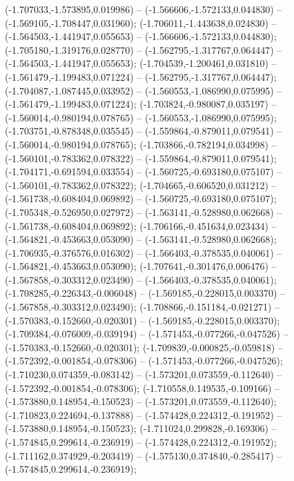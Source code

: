  (-1.707033,-1.573895,0.019986) -- (-1.566606,-1.572133,0.044830) -- (-1.569105,-1.708447,0.031960);
 (-1.706011,-1.443638,0.024830) -- (-1.564503,-1.441947,0.055653) -- (-1.566606,-1.572133,0.044830);
 (-1.705180,-1.319176,0.028770) -- (-1.562795,-1.317767,0.064447) -- (-1.564503,-1.441947,0.055653);
 (-1.704539,-1.200461,0.031810) -- (-1.561479,-1.199483,0.071224) -- (-1.562795,-1.317767,0.064447);
 (-1.704087,-1.087445,0.033952) -- (-1.560553,-1.086990,0.075995) -- (-1.561479,-1.199483,0.071224);
 (-1.703824,-0.980087,0.035197) -- (-1.560014,-0.980194,0.078765) -- (-1.560553,-1.086990,0.075995);
 (-1.703751,-0.878348,0.035545) -- (-1.559864,-0.879011,0.079541) -- (-1.560014,-0.980194,0.078765);
 (-1.703866,-0.782194,0.034998) -- (-1.560101,-0.783362,0.078322) -- (-1.559864,-0.879011,0.079541);
 (-1.704171,-0.691594,0.033554) -- (-1.560725,-0.693180,0.075107) -- (-1.560101,-0.783362,0.078322);
 (-1.704665,-0.606520,0.031212) -- (-1.561738,-0.608404,0.069892) -- (-1.560725,-0.693180,0.075107);
 (-1.705348,-0.526950,0.027972) -- (-1.563141,-0.528980,0.062668) -- (-1.561738,-0.608404,0.069892);
 (-1.706166,-0.451634,0.023434) -- (-1.564821,-0.453663,0.053090) -- (-1.563141,-0.528980,0.062668);
 (-1.706935,-0.376576,0.016302) -- (-1.566403,-0.378535,0.040061) -- (-1.564821,-0.453663,0.053090);
 (-1.707641,-0.301476,0.006476) -- (-1.567858,-0.303312,0.023490) -- (-1.566403,-0.378535,0.040061);
 (-1.708285,-0.226343,-0.006048) -- (-1.569185,-0.228015,0.003370) -- (-1.567858,-0.303312,0.023490);
 (-1.708866,-0.151184,-0.021271) -- (-1.570383,-0.152660,-0.020301) -- (-1.569185,-0.228015,0.003370);
 (-1.709384,-0.076009,-0.039194) -- (-1.571453,-0.077266,-0.047526) -- (-1.570383,-0.152660,-0.020301);
 (-1.709839,-0.000825,-0.059818) -- (-1.572392,-0.001854,-0.078306) -- (-1.571453,-0.077266,-0.047526);
 (-1.710230,0.074359,-0.083142) -- (-1.573201,0.073559,-0.112640) -- (-1.572392,-0.001854,-0.078306);
 (-1.710558,0.149535,-0.109166) -- (-1.573880,0.148954,-0.150523) -- (-1.573201,0.073559,-0.112640);
 (-1.710823,0.224694,-0.137888) -- (-1.574428,0.224312,-0.191952) -- (-1.573880,0.148954,-0.150523);
 (-1.711024,0.299828,-0.169306) -- (-1.574845,0.299614,-0.236919) -- (-1.574428,0.224312,-0.191952);
 (-1.711162,0.374929,-0.203419) -- (-1.575130,0.374840,-0.285417) -- (-1.574845,0.299614,-0.236919);
